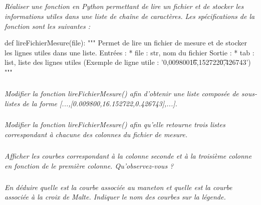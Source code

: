 \documentclass[10pt]{article}
\newif\ifprof
\begin{document}
\subparagraph{}
\textit{Réaliser une fonction en Python permettant de lire un fichier et de stocker les informations utiles dans une liste de chaîne de caractères. Les spécifications de la fonction sont les suivantes :}

\begin{py}
\begin{python}
def lireFichierMesure(file):
    """
    Permet de lire un fichier de mesure et de stocker les lignes utiles dans une liste.
    Entrées : 
      * file : str, nom du fichier
    Sortie :
      * tab : list, liste des lignes utiles
          (Exemple de ligne utile : '0,009800\t16,152722\t0,426743\n')
    """
\end{python}
\end{py}

\ifprof
\begin{corrige}
\begin{py}
\begin{python}
def lireFichierMesure(file):
    fid = open(file,'r')
    tab= []
    cpt = 0
    for ligne in fid :
        cpt = cpt + 1
        if cpt > 22 :
            tab.append(ligne)       
    fid.close()
    return tab
\end{python}
\end{py}

\end{corrige}
\else
\fi

\subparagraph{}
\textit{Modifier la fonction \textsf{lireFichierMesure()} afin d'obtenir une liste composée de sous-listes de la forme \textsf{[...,[0.009800,16.152722,0.426743],...]}.}
\ifprof
\begin{corrige}
\end{corrige}
\else
\fi

\subparagraph{}
\textit{Modifier la fonction \textsf{lireFichierMesure()} afin qu'elle retourne trois listes correspondant à chacune des colonnes du fichier de mesure.}
\ifprof
\begin{corrige}
\end{corrige}
\else
\fi


\subparagraph{}
\textit{Afficher les courbes correspondant à la colonne seconde et à la troisième colonne en fonction de le première colonne. Qu'observez-vous ?}
\ifprof
\begin{corrige}
\end{corrige}
\else
\fi

\subparagraph{}
\textit{En déduire quelle est la courbe associée au maneton et quelle est la courbe associée à la croix de Malte. Indiquer le nom des courbes sur la légende.}
\ifprof
\begin{corrige}
\end{corrige}
\else
\fi
\end{document}
